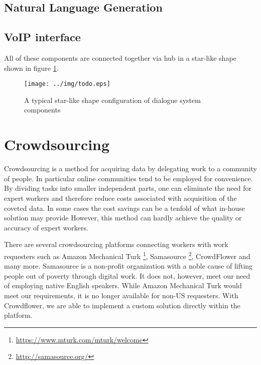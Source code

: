 
\subsection{Natural Language Generation}


\subsection{VoIP interface}



All of these components are connected together via hub in a star-like shape shown in figure \ref{fig:hub}.

\begin{figure}[ht]
	\centering
	\texttt{[image: ../img/todo.eps]}
	\caption{A typical star-like shape configuration of dialogue system components}
	\label{fig:hub}
\end{figure}




\section{Crowdsourcing}

Crowdsourcing is a method for acquiring data by delegating work to a community of people.
In particular online communities tend to be employed for convenience.
By dividing tasks into smaller independent parts, one can eliminate the need for expert workers and therefore reduce costs associated with acquisition of the coveted data.
In some cases the cost savings can be a tenfold of what in-house solution may provide \cite{Quality Management on Amazon Mechanical Turk} %
However, this method can hardly achieve the quality or accuracy of expert workers. 

There are several crowdsourcing platforms connecting workers with work requesters such as Amazon Mechanical Turk \footnote{\url{https://www.mturk.com/mturk/welcome}}, Samasource \footnote{\url{http://samasource.org/}}, CrowdFlower and many more.
Samasource is a non-profit organization with a noble cause of lifting people out of poverty through digital work.
It does not, however, meet our need of employing native English speakers.
While Amazon Mechanical Turk would meet our requirements, it is no longer available for non-US requesters.
With Crowdflower, we are able to implement a custom solution directly within the platform.

